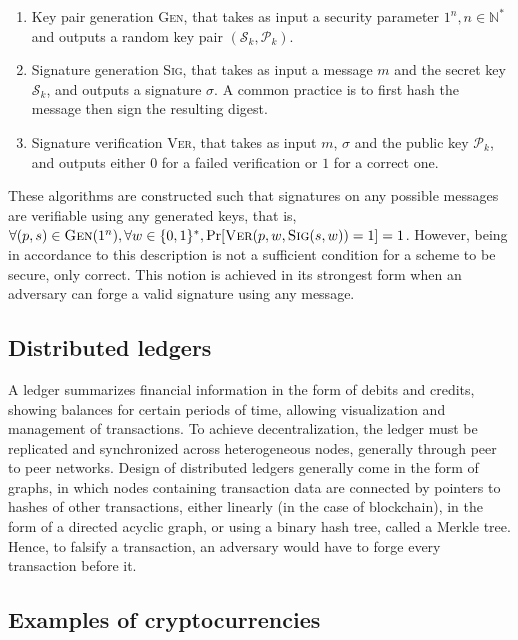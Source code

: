 \documentclass[12pt]{article}
\newcommand{\pk}{\mathcal{P}_{k}}
\newcommand{\sk}{\mathcal{S}_{k}}
\newcommand{\binwds}[1]{\{0, 1\}^{#1}}
\begin{document}
\begin{enumerate}[label= (\roman*)]
  \item Key pair generation \textsc{Gen}, that takes as input a security
    parameter $1^{n}, n \in \mathbb{N}^{*}$ and outputs a random key pair
    $(\sk{}, \pk{})$.
  \item Signature generation \textsc{Sig}, that takes as input a message $m$
    and the secret key $\sk{}$, and outputs a signature $\sigma$. A common
    practice is to first hash the message then sign the resulting digest.
  \item Signature verification \textsc{Ver}, that takes as input $m$, $\sigma$
    and the public key $\pk{}$, and outputs either $0$ for a failed
    verification or $1$ for a correct one.
\end{enumerate}

These algorithms are constructed such that signatures on any possible messages
are verifiable using any generated keys, that is,
$\forall (p, s) \in \textsc{Gen}(1^{n}), \forall w \in \binwds{*},
\text{Pr}[\textsc{Ver}(p, w, \textsc{Sig}(s, w)) = 1] = 1$. However, being in
accordance to this description is not a sufficient condition for a scheme to
be secure, only correct. This notion is achieved in its strongest form when an
adversary can forge a valid signature using any message.

\subsection*{Distributed ledgers}

A ledger summarizes financial information in the form of debits and credits,
showing balances for certain periods of time, allowing visualization and
management of transactions. To achieve decentralization, the ledger must be
replicated and synchronized across heterogeneous nodes, generally through peer
to peer networks. Design of distributed ledgers generally come in the form of
graphs, in which nodes containing transaction data are connected by pointers to
hashes of other transactions, either linearly (in the case of blockchain), in
the form of a directed acyclic graph, or using a binary hash tree, called a
Merkle tree. Hence, to falsify a transaction, an adversary would have to forge
every transaction before it.

\subsection*{Examples of cryptocurrencies}
\end{document}
